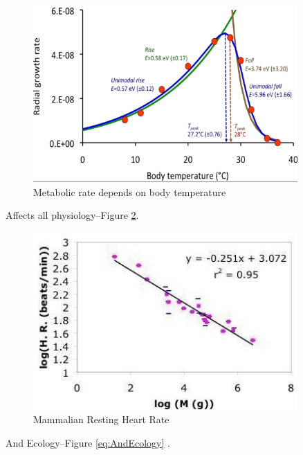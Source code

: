 \documentclass[]{article}
\begin{document}
\begin{figure}[H]
	\caption{Metabolic rate depends on body temperature}\label{fig:BodyTemperature}
	\includegraphics[width=0.9\textwidth]{BodyTemperature}
\end{figure}

Affects all physiology--Figure \ref{fig:MammalianRestingHeartRate}\cite{savage2004predominance}.

\begin{figure}[H]
	\caption{Mammalian Resting Heart Rate}\label{fig:MammalianRestingHeartRate}
	\includegraphics[width=0.9\textwidth]{MammalianRestingHeartRate}
\end{figure}

And Ecology--Figure \ref{eq:AndEcology} \cite{ernest2003thermodynamic}.
\end{document}
